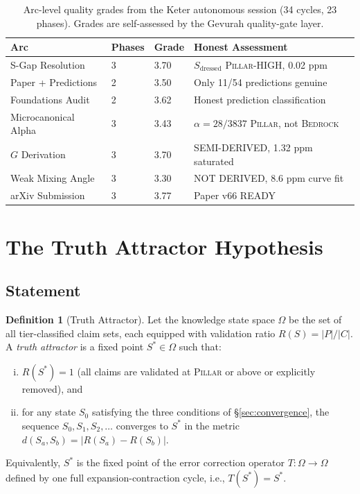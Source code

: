 \documentclass[11pt]{article}
\theoremstyle{definition}
\newtheorem{definition}[theorem]{Definition}
\theoremstyle{remark}
\newcommand{\BEDROCK}{\textsc{Bedrock}}
\newcommand{\PILLAR}{\textsc{Pillar}}
\begin{document}
\begin{table}[ht]
\centering
\caption{Arc-level quality grades from the Keter autonomous session (34 cycles,
  23 phases).  Grades are self-assessed by the Gevurah quality-gate layer.}
\label{tab:arc-metrics}
\begin{tabular}{@{}llll@{}}
\toprule
\textbf{Arc} & \textbf{Phases} & \textbf{Grade} & \textbf{Honest Assessment} \\
\midrule
S-Gap Resolution          & 3 & 3.70 & $S_\mathrm{dressed}$ \PILLAR-HIGH, 0.02 ppm \\
Paper + Predictions       & 2 & 3.50 & Only 11/54 predictions genuine \\
Foundations Audit         & 2 & 3.62 & Honest prediction classification \\
Microcanonical Alpha      & 3 & 3.43 & $\alpha = 28/3837$ \PILLAR, not \BEDROCK \\
$G$ Derivation            & 3 & 3.70 & SEMI-DERIVED, 1.32 ppm saturated \\
Weak Mixing Angle         & 3 & 3.30 & NOT DERIVED, 8.6 ppm curve fit \\
arXiv Submission          & 3 & 3.77 & Paper v66 READY \\
\bottomrule
\end{tabular}
\end{table}

\section{The Truth Attractor Hypothesis}
\label{sec:truth-attractor}

\subsection{Statement}
\label{sec:attractor-statement}

\begin{definition}[Truth Attractor]
\label{def:truth-attractor}
Let the knowledge state space $\Omega$ be the set of all tier-classified claim
sets, each equipped with validation ratio $R(S) = |P|/|C|$.
A \emph{truth attractor} is a fixed point $S^* \in \Omega$ such that:
\begin{enumerate}[(i)]
  \item $R(S^*) = 1$ (all claims are validated at \PILLAR{} or above or
    explicitly removed), and
  \item for any state $S_0$ satisfying the three conditions of
    \S\ref{sec:convergence}, the sequence $S_0, S_1, S_2, \ldots$ converges to
    $S^*$ in the metric $d(S_a, S_b) = |R(S_a) - R(S_b)|$.
\end{enumerate}
Equivalently, $S^*$ is the fixed point of the error correction operator
$T:\Omega\to\Omega$ defined by one full expansion-contraction cycle, i.e.,
$T(S^*) = S^*$.
\end{definition}
\end{document}
